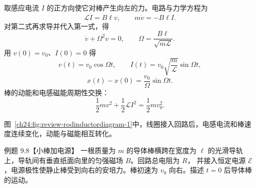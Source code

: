 \begin{xesolution}
取感应电流 $I$ 的正方向使它对棒产生向左的力。电路与力学方程为
\begin{equation}
  \mathcal L\dot I=B\ell v,
  \qquad m\dot v=-B\ell I.
\end{equation}
对第二式再求导并代入第一式，得
\begin{equation}
  \ddot v+\Omega^2v=0,
  \qquad
  \Omega=\frac{B\ell}{\sqrt{m\mathcal L}}.
\end{equation}
用 $v(0)=v_0$、$I(0)=0$ 得
\begin{equation}
  \boxed{v(t)=v_0\cos\Omega t},
  \qquad
  \boxed{I(t)=v_0\sqrt{\frac m{\mathcal L}}\sin\Omega t},
\end{equation}
\begin{equation}
  \boxed{x(t)-x(0)=\frac{v_0}{\Omega}\sin\Omega t}.
\end{equation}
棒的动能和电感磁能周期性交换：
\begin{equation}
  \frac12mv^2+\frac12\mathcal LI^2=\frac12mv_0^2.
\end{equation}

图~\ref{ch24:fig:review-rodinductordiagram-1}中，线圈接入回路后，电感电流和棒速度连续变化，动能与磁能相互转化。
\par\noindent\begin{minipage}{\linewidth}
\rodInductorDiagram
{}\label{ch24:fig:review-rodinductordiagram-1}
\end{minipage}\par\medskip
\end{xesolution}

\begin{origexamplebox}{例题 9.8【小棒加电源】}
一根质量为 $m$ 的导体棒横跨在宽度为 $\ell$ 的光滑导轨上，导轨间有垂直纸面向里的匀强磁场 $B$。回路总电阻为 $R$，
并接入恒定电源 $\mathcal E$，电源极性使静止棒受到向右的安培力。棒初速为 $v_0$ 向右。描述 $t=0$ 后导体棒的运动。

%
\begin{center}\end{center}
\label{fig:em24-question-8}
\end{origexamplebox}


